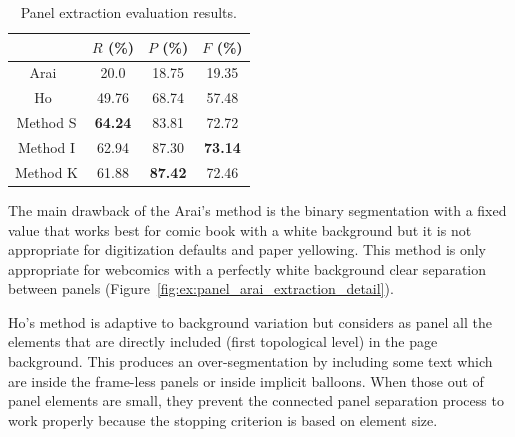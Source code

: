   \begin{table}[ht]
    \normalsize

    \centering
    \caption[Panel extraction evaluation results]{Panel extraction evaluation results.}
    \begin{tabular}{|c|c|c|c|}
          \hline
          &  $R$ (\%)  & $P$ (\%)  & $F$ (\%)     \\
          \hline
          Arai~\cite{Arai11}   & 20.0       & 18.75    & 19.35    \\
          \hline
          Ho~\cite{Ho2012}   & 49.76       & 68.74    & 57.48    \\
          \hline
          Method S          & \textbf{64.24}       & 83.81   & 72.72     \\
          \hline
          Method I          & 62.94       & 87.30   & \bf{73.14}      \\
          \hline
          Method K          & 61.88       & \textbf{87.42}     & 72.46      \\
          \hline
        \end{tabular}
    \label{tab:panel_extraction_comparision_results}
  \end{table}%


The main drawback of the Arai's method is the binary segmentation with a fixed value that works best for comic book with a white background but it is not appropriate for digitization defaults and paper yellowing.
This method is only appropriate for webcomics with a perfectly white background clear separation between panels (Figure~\ref{fig:ex:panel_arai_extraction_detail}).

Ho's method is adaptive to background variation but considers as panel all the elements that are directly included (first topological level) in the page background.
This produces an over-segmentation by including some text which are inside the frame-less panels or inside implicit balloons.
When those out of panel elements are small, they prevent the connected panel separation process to work properly because the stopping criterion is based on element size.

